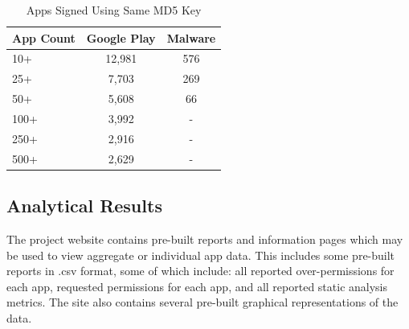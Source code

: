 \documentclass{sig-alternate-05-2015}
\begin{document}
\begin{table}[ht]
\begin{center}
\caption{Apps Signed Using Same MD5 Key}
\label{Table:md5Counts}
 \begin{tabular}{ | l | c | c | } \hline

	  \bfseries App Count & \bfseries   Google Play & \bfseries Malware \\ \hline



	
	10+ &	12,981	& 576 \\ \hline	
	25+	& 7,703	& 269 \\ \hline	
	50+	& 5,608	& 66 \\ \hline	
	100+ &	3,992	  & - \\ \hline	
	250+&	2,916	 & - \\ \hline	
	500+&	2,629	 & - \\ \hline	
	
	
	
        	 	
  \end{tabular}
\end{center}
\end{table}









\subsection{Analytical Results}

The project website contains pre-built reports and information pages which may be used to view aggregate or individual app data. This includes some pre-built reports in .csv format, some of which include: all reported over-permissions for each app, requested permissions for each app, and all reported static analysis metrics. The site also contains several pre-built graphical representations of the data. %
\end{document}
